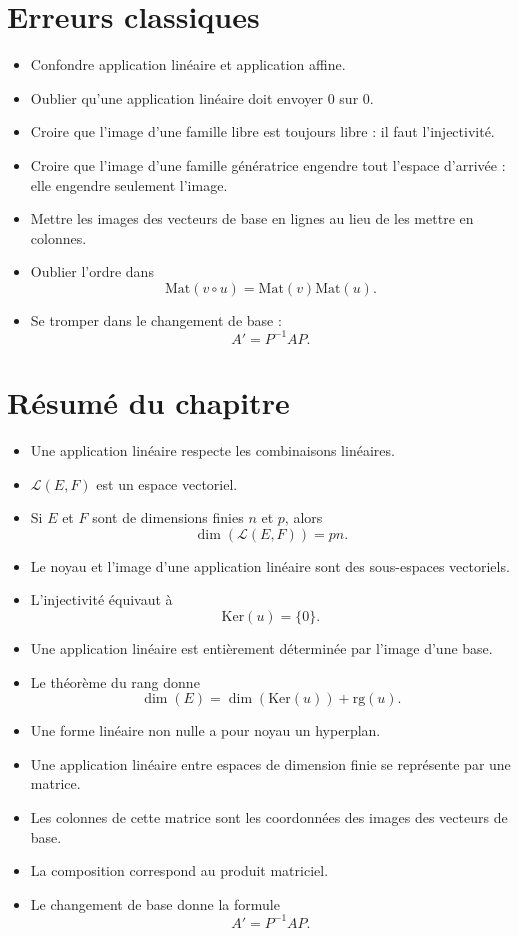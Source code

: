 \documentclass[11pt,a4paper]{article}
\theoremstyle{remark}
\newcommand{\Ker}{\mathrm{Ker}}
\newcommand{\rg}{\mathrm{rg}}
\newcommand{\Lin}{\mathcal{L}}
\begin{document}
\section{Erreurs classiques}

\begin{itemize}
    \item Confondre application linéaire et application affine.
    \item Oublier qu’une application linéaire doit envoyer \(0\) sur \(0\).
    \item Croire que l’image d’une famille libre est toujours libre : il faut l’injectivité.
    \item Croire que l’image d’une famille génératrice engendre tout l’espace d’arrivée : elle engendre seulement l’image.
    \item Mettre les images des vecteurs de base en lignes au lieu de les mettre en colonnes.
    \item Oublier l’ordre dans
    \[
    \mathrm{Mat}(v\circ u)=\mathrm{Mat}(v)\mathrm{Mat}(u).
    \]
    \item Se tromper dans le changement de base :
    \[
    A'=P^{-1}AP.
    \]
\end{itemize}

\section{Résumé du chapitre}

\begin{itemize}
    \item Une application linéaire respecte les combinaisons linéaires.
    \item \(\Lin(E,F)\) est un espace vectoriel.
    \item Si \(E\) et \(F\) sont de dimensions finies \(n\) et \(p\), alors
    \[
    \dim(\Lin(E,F))=pn.
    \]
    \item Le noyau et l’image d’une application linéaire sont des sous-espaces vectoriels.
    \item L’injectivité équivaut à
    \[
    \Ker(u)=\{0\}.
    \]
    \item Une application linéaire est entièrement déterminée par l’image d’une base.
    \item Le théorème du rang donne
    \[
    \dim(E)=\dim(\Ker(u))+\rg(u).
    \]
    \item Une forme linéaire non nulle a pour noyau un hyperplan.
    \item Une application linéaire entre espaces de dimension finie se représente par une matrice.
    \item Les colonnes de cette matrice sont les coordonnées des images des vecteurs de base.
    \item La composition correspond au produit matriciel.
    \item Le changement de base donne la formule
    \[
    A'=P^{-1}AP.
    \]
\end{itemize}
\end{document}
